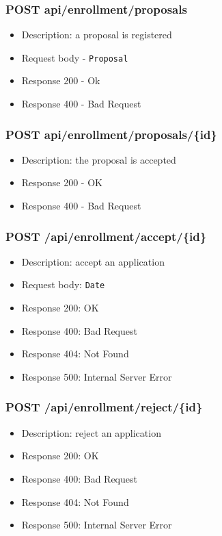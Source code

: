 \subsubsection{POST api/enrollment/proposals}
\begin{itemize}
    \item Description: a proposal is registered
    \item Request body - \verb|Proposal|
    \item Response 200 - Ok
    \item Response 400 - Bad Request
\end{itemize}

\subsubsection{POST api/enrollment/proposals/\{id\}}
\begin{itemize}
    \item Description: the proposal is accepted
    \item Response 200 - OK
    \item Response 400 - Bad Request
\end{itemize}

\subsubsection{POST /api/enrollment/accept/\{id\}}
\begin{itemize}
    \item Description: accept an application
    \item Request body: \verb|Date|
    \item Response 200: OK
    \item Response 400: Bad Request
    \item Response 404: Not Found
    \item Response 500: Internal Server Error
\end{itemize}

\subsubsection{POST /api/enrollment/reject/\{id\}}
\begin{itemize}
    \item Description: reject an application
    \item Response 200: OK
    \item Response 400: Bad Request
    \item Response 404: Not Found
    \item Response 500: Internal Server Error
\end{itemize}

